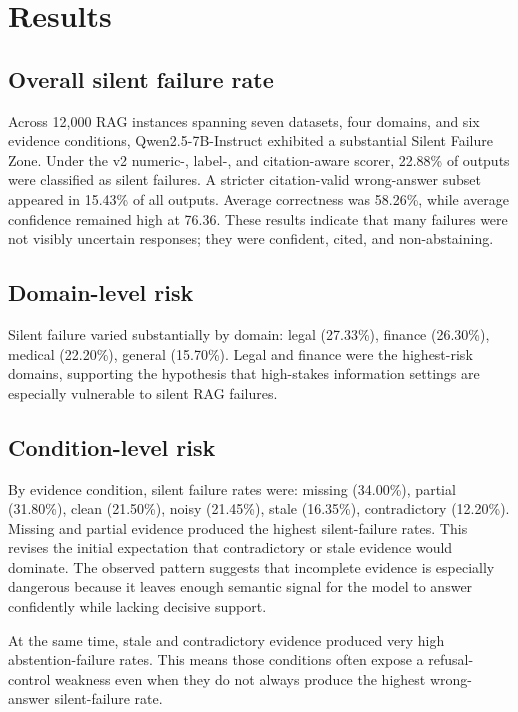 \section{Results}



\subsection{Overall silent failure rate}

Across 12,000 RAG instances spanning seven datasets, four domains, and six evidence conditions, Qwen2.5-7B-Instruct exhibited a substantial Silent Failure Zone. Under the v2 numeric-, label-, and citation-aware scorer, 22.88\% of outputs were classified as silent failures. A stricter citation-valid wrong-answer subset appeared in 15.43\% of all outputs. Average correctness was 58.26\%, while average confidence remained high at 76.36. These results indicate that many failures were not visibly uncertain responses; they were confident, cited, and non-abstaining.



\subsection{Domain-level risk}

Silent failure varied substantially by domain: legal (27.33\%), finance (26.30\%), medical (22.20\%), general (15.70\%). Legal and finance were the highest-risk domains, supporting the hypothesis that high-stakes information settings are especially vulnerable to silent RAG failures.



\subsection{Condition-level risk}

By evidence condition, silent failure rates were: missing (34.00\%), partial (31.80\%), clean (21.50\%), noisy (21.45\%), stale (16.35\%), contradictory (12.20\%). Missing and partial evidence produced the highest silent-failure rates. This revises the initial expectation that contradictory or stale evidence would dominate. The observed pattern suggests that incomplete evidence is especially dangerous because it leaves enough semantic signal for the model to answer confidently while lacking decisive support.

At the same time, stale and contradictory evidence produced very high abstention-failure rates. This means those conditions often expose a refusal-control weakness even when they do not always produce the highest wrong-answer silent-failure rate.



